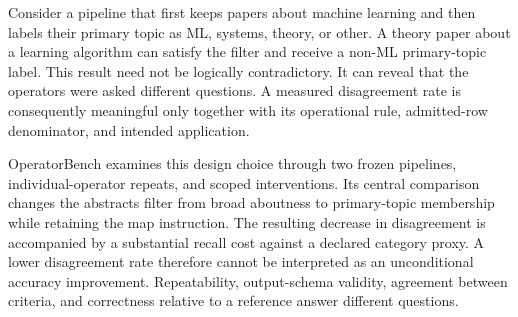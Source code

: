 \documentclass[11pt]{article}
\begin{document}
Consider a pipeline that first keeps papers about machine learning and
then labels their primary topic as ML, systems, theory, or other. A theory
paper about a learning algorithm can satisfy the filter and receive a
non-ML primary-topic label. This result need not be logically contradictory.
It can reveal that the operators were asked different questions. A measured
disagreement rate is consequently meaningful only together with its
operational rule, admitted-row denominator, and intended application.

OperatorBench examines this design choice through two frozen pipelines,
individual-operator repeats, and scoped interventions. Its central
comparison changes the abstracts filter from broad aboutness to primary-topic
membership while retaining the map instruction. The resulting decrease in
disagreement is accompanied by a substantial recall cost against a declared
category proxy. A lower disagreement rate therefore cannot be interpreted
as an unconditional accuracy improvement. Repeatability, output-schema
validity, agreement between criteria, and correctness relative to a reference
answer different questions.
\end{document}
